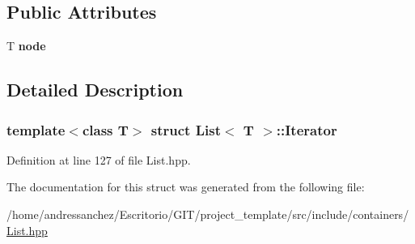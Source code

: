 \subsection*{Public Attributes}
\begin{DoxyCompactItemize}
\item 
\mbox{\label{structList_1_1Iterator_acc7d2bcd20a47511a10b7c0cca3bc844}} 
T {\bfseries node}
\end{DoxyCompactItemize}


\subsection{Detailed Description}
\subsubsection*{template$<$class T$>$\newline
struct List$<$ T $>$\+::\+Iterator}



Definition at line 127 of file List.\+hpp.



The documentation for this struct was generated from the following file\+:\begin{DoxyCompactItemize}
\item 
/home/andressanchez/\+Escritorio/\+G\+I\+T/project\+\_\+template/src/include/containers/\hyperlink{List_8hpp}{List.\+hpp}\end{DoxyCompactItemize}
